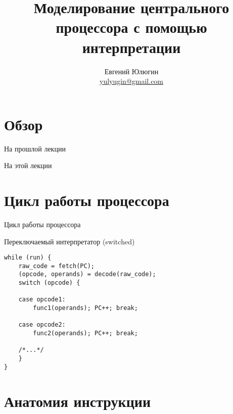 

\title{Моделирование центрального процессора с помощью интерпретации}
\author[Евгений Юлюгин]{Евгений Юлюгин \\ \small{\href{mailto:yulyugin@gmail.com}{yulyugin@gmail.com}}}



\begin{frame}
\titlepage
\end{frame}

\section*{Обзор}

\begin{frame}{На прошлой лекции}
\end{frame}

\begin{frame}{На этой лекции}
\tableofcontents
\end{frame} 


\section{Цикл работы процессора}

\begin{frame}{Цикл работы процессора}
\centering
{}
\end{frame}

\begin{frame}[fragile]{Переключаемый интерпретатор (switched)}
\begin{lstlisting}
while (run) {
    raw_code = fetch(PC);
    (opcode, operands) = decode(raw_code);
    switch (opcode) {

    case opcode1:
        func1(operands); PC++; break;

    case opcode2:
        func2(operands); PC++; break;

    /*...*/
    }
}
\end{lstlisting}
\end{frame}

\section{Анатомия инструкции}

